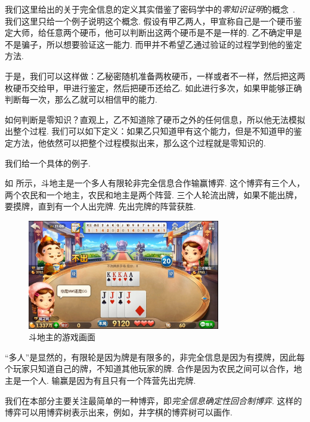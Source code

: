 \begin{remark}
    我们这里给出的关于完全信息的定义其实借鉴了密码学中的\textit{零知识证明}的概念~\cite{goldwasserKnowledgeComplexityInteractive1985}. 我们这里只给一个例子说明这个概念. 假设有甲乙两人，甲宣称自己是一个硬币鉴定大师，给任意两个硬币，他可以判断出这两个硬币是不是一样的. 乙不确定甲是不是骗子，所以想要验证这一能力. 而甲并不希望乙通过验证的过程学到他的鉴定方法. 
    
    于是，我们可以这样做：乙秘密随机准备两枚硬币，一样或者不一样，然后把这两枚硬币交给甲，甲进行鉴定，然后把硬币还给乙. 如此进行多次，如果甲能够正确判断每一次，那么乙就可以相信甲的能力. 

    如何判断是零知识？直观上，乙不知道除了硬币之外的任何信息，所以他无法模拟出整个过程. 我们可以如下定义：如果乙只知道甲有这个能力，但是不知道甲的鉴定方法，他依然可以把整个过程模拟出来，那么这个过程就是零知识的. 
\end{remark}

我们给一个具体的例子. 

\begin{example}
    如 所示，斗地主是一个多人有限轮非完全信息合作输赢博弈. 这个博弈有三个人，两个农民和一个地主，农民和地主是两个阵营. 三个人轮流出牌，如果不能出牌，要摸牌，直到有一个人出完牌. 先出完牌的阵营获胜. 

    \begin{figure}[ht]
        \centering
        \includegraphics[width=0.75\textwidth]{figures/game/fight-landlord.jpg}
        \caption{斗地主的游戏画面} \label{fig:fight-landlord}
    \end{figure}

    “多人”是显然的，有限轮是因为牌是有限多的，非完全信息是因为有摸牌，因此每个玩家只知道自己的牌，不知道其他玩家的牌. 合作是因为农民之间可以合作，地主是一个人. 输赢是因为有且只有一个阵营先出完牌. 
\end{example}

我们在本部分主要关注最简单的一种博弈，即\textit{完全信息确定性回合制博弈}. 这样的博弈可以用博弈树表示出来，例如，井字棋的博弈树可以画作.

